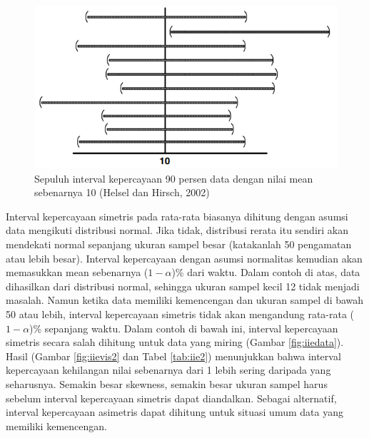 \documentclass[]{book}
\begin{document}
\begin{figure}

{\centering \includegraphics[width=0.65\linewidth]{iievis} 

}

\caption{Sepuluh interval kepercayaan 90 persen data dengan nilai mean sebenarnya 10 (Helsel dan Hirsch, 2002)}\label{fig:iievis}
\end{figure}

Interval kepercayaan simetris pada rata-rata biasanya dihitung dengan
asumsi data mengikuti distribusi normal. Jika tidak, distribusi rerata
itu sendiri akan mendekati normal sepanjang ukuran sampel besar
(katakanlah 50 pengamatan atau lebih besar). Interval kepercayaan dengan
asumsi normalitas kemudian akan memasukkan mean sebenarnya
(\(1-\alpha\))\% dari waktu. Dalam contoh di atas, data dihasilkan dari
distribusi normal, sehingga ukuran sampel kecil 12 tidak menjadi
masalah. Namun ketika data memiliki kemencengan dan ukuran sampel di
bawah 50 atau lebih, interval kepercayaan simetris tidak akan mengandung
rata-rata (\(1-\alpha\))\% sepanjang waktu. Dalam contoh di bawah ini,
interval kepercayaan simetris secara salah dihitung untuk data yang
miring (Gambar \ref{fig:iiedata}). Hasil (Gambar \ref{fig:iievis2} dan
Tabel \ref{tab:iie2}) menunjukkan bahwa interval kepercayaan kehilangan
nilai sebenarnya dari 1 lebih sering daripada yang seharusnya. Semakin
besar skewness, semakin besar ukuran sampel harus sebelum interval
kepercayaan simetris dapat diandalkan. Sebagai alternatif, interval
kepercayaan asimetris dapat dihitung untuk situasi umum data yang
memiliki kemencengan.
\end{document}
